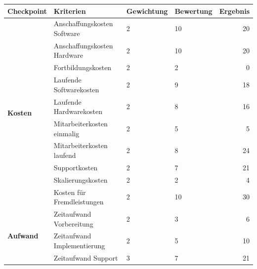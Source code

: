 \begin{table}
	\centering
	\begin{tabular}{l|l|l|l|r|}
		\textbf{Checkpoint}                    & \textbf{Kriterien}                  & \textbf{Gewichtung} & \textbf{Bewertung} & \textbf{Ergebnis} \\
		\hline \hline
		\multirow{10}{6em}{\textbf{Kosten}}    & Anschaffungskosten Software         & 2                   & 10                 & 20                \\
		~                                      & Anschaffungskosten Hardware         & 2                   & 10                 & 20                \\
		~                                      & Fortbildungskosten                  & 2                   & 2                  & 0                 \\
		~                                      & Laufende Softwarekosten             & 2                   & 9                  & 18                \\
		~                                      & Laufende Hardwarekosten             & 2                   & 8                  & 16                \\
		~                                      & Mitarbeiterkosten einmalig          & 2                   & 5                  & 5                 \\
		~                                      & Mitarbeiterkosten laufend           & 2                   & 8                  & 24                \\
		~                                      & Supportkosten                       & 2                   & 7                  & 21                \\
		~                                      & Skalierungskosten                   & 2                   & 2                  & 4                 \\
		~                                      & Kosten für Fremdleistungen          & 2                   & 10                 & 30                \\
		\cline{2-5}
		\multirow{6}{6em}{\textbf{Aufwand}}    & Zeitaufwand Vorbereitung            & 2                   & 3                  & 6                 \\
		~                                      & Zeitaufwand Implementierung         & 2                   & 5                  & 10                \\
		~                                      & Zeitaufwand Support                 & 3                   & 7                  & 21                \\

\end{tabular}
\end{table}
